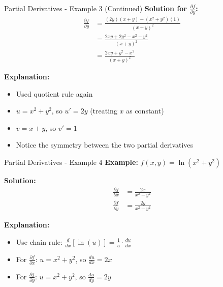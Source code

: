 \documentclass[aspectratio=169]{beamer}
\begin{document}
\begin{frame}{Partial Derivatives - Example 3 (Continued)}
\textbf{Solution for $\frac{\partial f}{\partial y}$:}
\begin{align*}
    \frac{\partial f}{\partial y} &= \frac{(2y)(x + y) - (x^2 + y^2)(1)}{(x + y)^2} \\
    &= \frac{2xy + 2y^2 - x^2 - y^2}{(x + y)^2} \\
    &= \frac{2xy + y^2 - x^2}{(x + y)^2}
\end{align*}

\textbf{Explanation:}
\begin{itemize}
    \item Used quotient rule again
    \item $u = x^2 + y^2$, so $u' = 2y$ (treating $x$ as constant)
    \item $v = x + y$, so $v' = 1$
    \item Notice the symmetry between the two partial derivatives
\end{itemize}
\end{frame}

\begin{frame}{Partial Derivatives - Example 4}
\textbf{Example:} $f(x,y) = \ln(x^2 + y^2)$

\textbf{Solution:}
\begin{align*}
    \frac{\partial f}{\partial x} &= \frac{2x}{x^2 + y^2} \\
    \frac{\partial f}{\partial y} &= \frac{2y}{x^2 + y^2}
\end{align*}

\textbf{Explanation:}
\begin{itemize}
    \item Use chain rule: $\frac{d}{dx}[\ln(u)] = \frac{1}{u} \cdot \frac{du}{dx}$
    \item For $\frac{\partial f}{\partial x}$: $u = x^2 + y^2$, so $\frac{du}{dx} = 2x$
    \item For $\frac{\partial f}{\partial y}$: $u = x^2 + y^2$, so $\frac{du}{dy} = 2y$
\end{itemize}
\end{frame}
\end{document}
